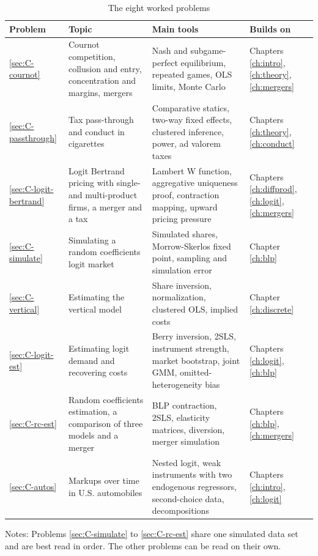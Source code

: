 \begin{table}[tb]
\centering
\caption{The eight worked problems}
\label{tab:C-map}
\footnotesize
\begin{tabularx}{\textwidth}{@{}l>{\raggedright\arraybackslash}X>{\raggedright\arraybackslash}Xl@{}}
\toprule
Problem & Topic & Main tools & Builds on \\
\midrule
\ref{sec:C-cournot} & Cournot competition, collusion and entry, concentration and margins, mergers &
  Nash and subgame-perfect equilibrium, repeated games, OLS limits, Monte Carlo & Chapters \ref{ch:intro},
  \ref{ch:theory}, \ref{ch:mergers} \\
\addlinespace
\ref{sec:C-passthrough} & Tax pass-through and conduct in cigarettes & Comparative statics, two-way fixed effects,
  clustered inference, power, ad valorem taxes & Chapters \ref{ch:theory}, \ref{ch:conduct} \\
\addlinespace
\ref{sec:C-logit-bertrand} & Logit Bertrand pricing with single- and multi-product firms, a merger and a tax &
  Lambert W function, aggregative uniqueness proof, contraction mapping, upward pricing pressure & Chapters
  \ref{ch:diffprod}, \ref{ch:logit}, \ref{ch:mergers} \\
\addlinespace
\ref{sec:C-simulate} & Simulating a random coefficients logit market & Simulated shares, Morrow-Skerlos fixed
  point, sampling and simulation error & Chapter \ref{ch:blp} \\
\addlinespace
\ref{sec:C-vertical} & Estimating the vertical model & Share inversion, normalization, clustered OLS, implied
  costs & Chapter \ref{ch:discrete} \\
\addlinespace
\ref{sec:C-logit-est} & Estimating logit demand and recovering costs & Berry inversion, 2SLS, instrument
  strength, market bootstrap, joint GMM, omitted-heterogeneity bias & Chapters \ref{ch:logit}, \ref{ch:blp} \\
\addlinespace
\ref{sec:C-rc-est} & Random coefficients estimation, a comparison of three models and a merger & BLP contraction,
  2SLS, elasticity matrices, diversion, merger simulation & Chapters \ref{ch:blp}, \ref{ch:mergers} \\
\addlinespace
\ref{sec:C-autos} & Markups over time in U.S. automobiles & Nested logit, weak instruments with two endogenous
  regressors, second-choice data, decompositions & Chapters \ref{ch:intro}, \ref{ch:logit} \\
\bottomrule
\end{tabularx}

\vspace{3pt}
\begin{minipage}{0.97\textwidth}
\footnotesize Notes: Problems \ref{sec:C-simulate} to \ref{sec:C-rc-est} share one simulated data set and are best
read in order. The other problems can be read on their own.
\end{minipage}
\end{table}

